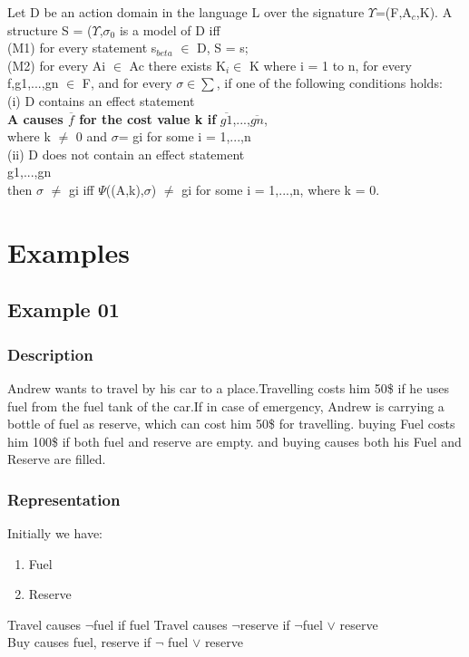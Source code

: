 \documentclass[11pt]{article}
\begin{document}
Let D be an action domain in the language L over the signature $\Upsilon$=(F,A$_{c}$,K). A structure S = ($\Upsilon$,$\sigma_{0}$ is a model of D iff\\
(M1) for every statement s$_{beta}$ $\in$ D, S \textbar= s;\\
(M2) for every Ai $\in$ Ac there exists K$_{i} \in$ K where i = 1 to n, for every f,g1,...,gn $\in$ F, and for every $\sigma\in\sum$, if one of the following conditions holds:
\\\indent
(i) D contains an effect statement\\
\indent\indent 
{\bfseries A causes $\overline{f}$ for the cost value k if} $\overline{g1}$,...,$\overline{gn}$,\\
\indent where k $\neq$ 0 and $\sigma$\textbar=  gi for some i = 1,...,n\\
\indent(ii) D does not contain an effect statement\\
\indent{} g1,...,gn\\
\indent then $\sigma$ \textbar$\neq$ gi iff $\Psi$((A,k),$\sigma$) \textbar$\neq$ gi for some i = 1,...,n, where k = 0.\\

	\section{Examples}\label{sec:Examples}
	\subsection{Example 01}\label{example:ex01}
	\subsubsection{Description}\label{par:p101}
	Andrew wants to travel by his car to a place.Travelling costs him 50\$ if he uses fuel from the fuel tank of the car.If in case of emergency, Andrew is carrying a bottle of fuel as reserve, which can cost him 50\$ for travelling. buying Fuel costs him 100\$ if both fuel and reserve are empty. and buying causes both his Fuel and Reserve are filled. 
	\subsubsection{Representation}\label{par:p201}
	Initially we have:
	\begin{enumerate}
		\item Fuel
		\item Reserve
	\end{enumerate}
	Travel causes $\neg$fuel if fuel %
	Travel causes $\neg$reserve if $\neg$fuel $\vee$ reserve\\
	Buy causes fuel, reserve  if $\neg$ fuel $\vee$ reserve\\
\end{document}
